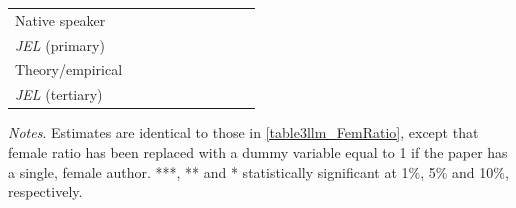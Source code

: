 \begin{table}
\begin{threeparttable}
\begin{tabular}{p{3cm}S@{}S@{}S@{}S@{}S@{}S@{}S@{}S@{}S@{}}
            Native speaker                &               &               &               &               &           {}   &           {}   &           {}   &           {}   &           {}   \\
            \textit{JEL} (primary)        &               &               &               &               &               &               &           {}   &               &               \\
            Theory/empirical              &               &               &               &               &               &               &               &           {}   &               \\
            \textit{JEL} (tertiary)       &               &               &               &               &               &               &               &               &           {}   \\
            \bottomrule
        \end{tabular}
        \begin{tablenotes}
            \tiny
            \item \textit{Notes}. Estimates are identical to those in \autoref{table3llm_FemRatio}, except that female ratio has been replaced with a dummy variable equal to 1 if the paper has a single, female author. ***, ** and * statistically significant at 1\%, 5\% and 10\%, respectively.
        \end{tablenotes}
    \end{threeparttable}

\end{table}
